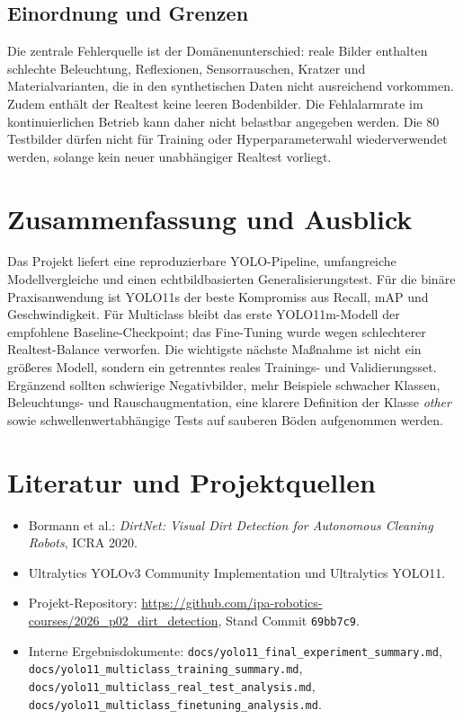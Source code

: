 \documentclass[conference,a4paper]{IEEEtran}
\begin{document}
\subsection{Einordnung und Grenzen}
Die zentrale Fehlerquelle ist der Domänenunterschied: reale Bilder enthalten schlechte Beleuchtung, Reflexionen, Sensorrauschen, Kratzer und Materialvarianten, die in den synthetischen Daten nicht ausreichend vorkommen. Zudem enthält der Realtest keine leeren Bodenbilder. Die Fehlalarmrate im kontinuierlichen Betrieb kann daher nicht belastbar angegeben werden. Die 80 Testbilder dürfen nicht für Training oder Hyperparameterwahl wiederverwendet werden, solange kein neuer unabhängiger Realtest vorliegt.

\section{Zusammenfassung und Ausblick}
Das Projekt liefert eine reproduzierbare YOLO-Pipeline, umfangreiche Modellvergleiche und einen echtbildbasierten Generalisierungstest. Für die binäre Praxisanwendung ist YOLO11s der beste Kompromiss aus Recall, mAP und Geschwindigkeit. Für Multiclass bleibt das erste YOLO11m-Modell der empfohlene Baseline-Checkpoint; das Fine-Tuning wurde wegen schlechterer Realtest-Balance verworfen. Die wichtigste nächste Maßnahme ist nicht ein größeres Modell, sondern ein getrenntes reales Trainings- und Validierungsset. Ergänzend sollten schwierige Negativbilder, mehr Beispiele schwacher Klassen, Beleuchtungs- und Rauschaugmentation, eine klarere Definition der Klasse \emph{other} sowie schwellenwertabhängige Tests auf sauberen Böden aufgenommen werden.

\section*{Literatur und Projektquellen}
\begin{itemize}\small
\item Bormann et al.: \emph{DirtNet: Visual Dirt Detection for Autonomous Cleaning Robots}, ICRA 2020.
\item Ultralytics YOLOv3 Community Implementation und Ultralytics YOLO11.
\item Projekt-Repository: \url{https://github.com/ipa-robotics-courses/2026_p02_dirt_detection}, Stand Commit \texttt{69bb7c9}.
\item Interne Ergebnisdokumente: \texttt{docs/yolo11\_final\_experiment\_summary.md}, \texttt{docs/yolo11\_multiclass\_training\_summary.md}, \texttt{docs/yolo11\_multiclass\_real\_test\_analysis.md}, \texttt{docs/yolo11\_multiclass\_finetuning\_analysis.md}.
\end{itemize}
\end{document}
